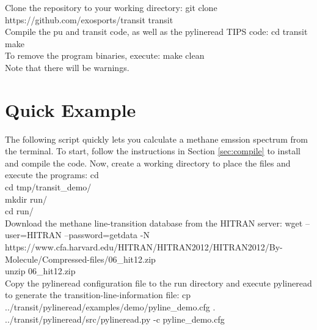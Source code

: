 \documentclass[letterpaper, 12pt]{article}
\begin{document}
\noindent Clone the repository to your working directory: \newline
{\tttb git clone https://github.com/exosports/transit transit} \\

\noindent Compile the {\tttm pu} and {\tttm transit} code, as well as
the {\tttm pylineread} TIPS code: \newline
{\tttb cd transit} \\
{\tttb make} \\

\noindent To remove the program binaries, execute: \newline
{\tttb make clean} \\

\noindent Note that there will be warnings.

\newpage

\section{Quick Example}
\label{sec:quick-example}

The following script quickly lets you calculate a methane emssion
spectrum from the terminal.  To start, follow the instructions in
Section \ref{sec:compile} to install and compile the code.  Now,
create a working directory to place the files and execute the
programs: \newline
{\tttb cd} \\
{\tttb cd tmp/transit\_demo/} \\
{\tttb mkdir run/} \\
{\tttb cd run/} \\

\noindent Download the methane line-transition database from the HITRAN
server: \newline
{\tttb 
wget --user=HITRAN --password=getdata -N https://www.cfa.harvard.edu/HITRAN/HITRAN2012/HITRAN2012/By-Molecule/Compressed-files/06\_hit12.zip} \\
{\tttb unzip 06\_hit12.zip} \\

\noindent Copy the {\tttm pylineread} configuration file to the run directory and execute pylineread to generate the transition-line-information file: \newline
{\tttb cp ../transit/pylineread/examples/demo/pyline\_demo.cfg .} \\
{\tttb ../transit/pylineread/src/pylineread.py -c pyline\_demo.cfg} \\
\end{document}
